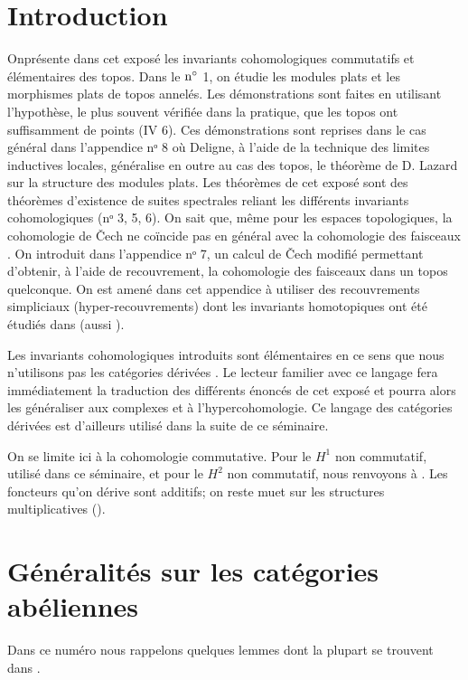 \section*{Introduction}

On\pageoriginale présente dans cet exposé les invariants
cohomologiques commutatifs et élémentaires des topos. Dans le ${\rm
n^{\circ}}$ 1, on étudie les modules plats et les morphismes plats
de topos annelés. Les démonstrations sont faites en utilisant
l'hypothèse, le plus souvent vérifiée dans la pratique, que les
topos ont suffisamment de points (IV 6). Ces démonstrations sont
reprises dans le cas général dans l'appendice nᵒ 8
où Deligne, à l'aide de la technique des limites inductives
locales, généralise en outre au cas des topos, le théorème de D.
Lazard sur la structure des modules plats. Les théorèmes de cet
exposé\sisi{,}{} sont des théorèmes d'existence de suites spectrales reliant
les différents invariants cohomologiques (nᵒ 3, 5, 6). On
sait que, même pour les espaces topologiques, la cohomologie de Čech
ne coïncide pas en général avec la cohomologie des faisceaux
\cite{11}. On introduit dans l'appendice nᵒ 7, un
calcul de Čech modifié permettant d'obtenir, à l'aide de
recouvrement, la cohomologie des faisceaux dans un topos quelconque.
On est amené dans cet appendice à utiliser des recouvrements
simpliciaux (hyper-recouvrements) dont les invariants homotopiques
ont été étudiés dans \cite{1} (\cf aussi \cite{17}).

Les invariants cohomologiques introduits sont élémentaires en ce
sens que nous n'utilisons pas les catégories dérivées \cite{12}. Le
lecteur familier avec ce langage fera immédiatement la traduction
des différents énoncés de cet exposé et pourra alors les
généraliser aux complexes et à l'hypercohomologie. Ce langage des
catégories dérivées est d'ailleurs utilisé dans la suite de ce
séminaire.

On se limite ici à la cohomologie commutative. Pour le $H^1$ non
commutatif, utilisé dans ce séminaire, et pour le $H^2$ non
commutatif, nous renvoyons à \cite{9}. Les foncteurs qu'on dérive sont
additifs; on reste muet sur les structures multiplicatives (\cf \cite{7}).

\setcounter{section}{-1}
\section{Généralités sur les catégories abéliennes}

Dans \pageoriginale ce numéro nous rappelons quelques lemmes dont la
plupart se trouvent dans \cite{11}.

